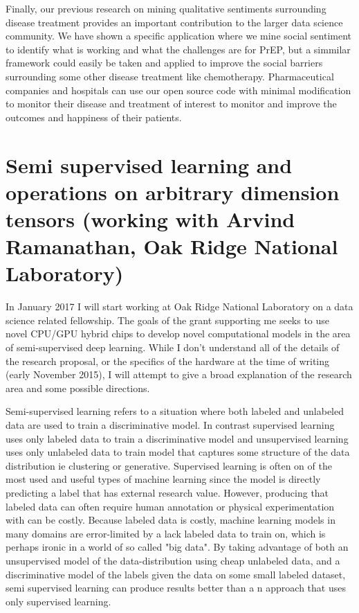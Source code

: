Finally, our previous research on mining qualitative sentiments surrounding disease treatment provides an important contribution to the larger data science community. We have shown a specific application where we mine social sentiment to identify what is working and what the challenges are for PrEP, but a simmilar framework could easily be taken and applied to improve the social barriers surrounding some other disease treatment like chemotherapy. Pharmaceutical companies and hospitals can use our open source code with minimal modification to monitor their disease and treatment of interest to monitor and improve the outcomes and happiness of their patients.

\section{Semi supervised learning and operations on arbitrary dimension tensors (working with Arvind Ramanathan, Oak Ridge National Laboratory)}

In January 2017 I will start working at Oak Ridge National Laboratory on a data science related fellowship. The goals of the grant supporting me seeks to use novel CPU/GPU hybrid chips to develop novel computational models in the area of semi-supervised deep learning. While I don't understand all of the details of the research proposal, or the specifics of the hardware at the time of writing (early November 2015), I will attempt to give a broad explanation of the research area and some possible directions.

Semi-supervised learning refers to a situation where both labeled and unlabeled data are used to train a discriminative model\cite{zhu2011semi}. In contrast supervised learning uses only labeled data to train a discriminative model and unsupervised learning uses only unlabeled data to train model that captures some structure of the data distribution ie clustering or generative. Supervised learning is often on of the most used and useful types of machine learning since the model is directly predicting a label that has external research value. However, producing that labeled data can often require human annotation or physical experimentation with can be costly. Because labeled data is costly, machine learning models in many domains are error-limited by a lack labeled data to train on\cite{guillaumin2010multimodal}, which is perhaps ironic in a world of so called "big data". By taking advantage of both an unsupervised model of the data-distribution using cheap unlabeled data, and a discriminative model of the labels given the data on some small labeled dataset, semi supervised learning can produce results better than a n approach that uses only supervised learning.

